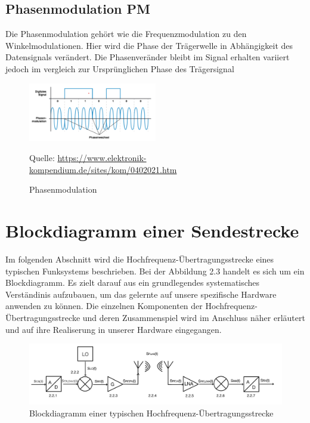 \subsection{Phasenmodulation PM}
Die Phasenmodulation gehört wie die Frequenzmodulation zu den Winkelmodulationen.
Hier wird die Phase der Trägerwelle in Abhängigkeit des Datensignals verändert.
Die Phasenveränder bleibt im Signal erhalten variiert jedoch im vergleich
zur Ursprünglichen Phase des Trägersignal
\begin{figure}[h]
    \centering
    \includegraphics[width=0.5\textwidth]{Pictures/04020211.png}
    \caption{Phasenmodulation}
    \footnotesize{Quelle: \url{https://www.elektronik-kompendium.de/sites/kom/0402021.htm}}
\end{figure}

\section{Blockdiagramm einer Sendestrecke}
Im folgenden Abschnitt wird die Hochfrequenz-Übertragungsstrecke eines typischen Funksystems beschrieben. Bei der Abbildung 2.3 handelt es sich um ein Blockdiagramm. Es zielt darauf aus ein grundlegendes
systematisches Verständinis aufzubauen, um das gelernte auf unsere spezifische Hardware anwenden zu können. Die einzelnen Komponenten der Hochfrequenz-Übertragungsstrecke 
und deren Zusammenspiel wird im Anschluss näher erläutert und auf ihre Realiserung in unserer Hardware eingegangen.\\

\begin{figure}[h]
    \centering
    \includegraphics[width=1\textwidth]{Pictures/Blockdiagramm.jpg}   
    \caption{Blockdiagramm einer typischen Hochfrequenz-Übertragungsstrecke}
\end{figure}
\clearpage

